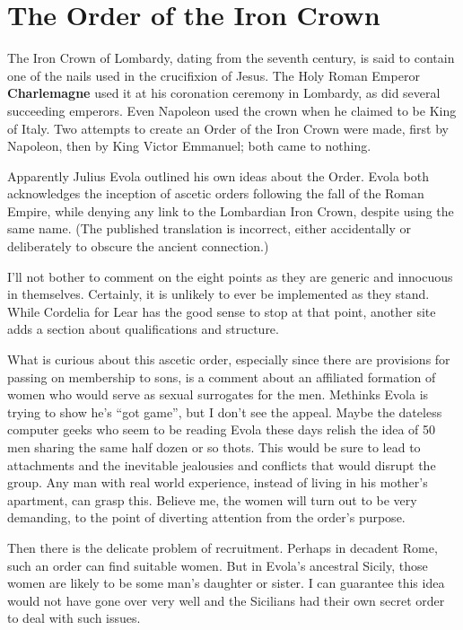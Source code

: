 \section{The Order of the Iron Crown}

The Iron Crown of Lombardy, dating from the seventh century, is said to contain one of the nails used in the crucifixion of Jesus. The Holy Roman Emperor \textbf{Charlemagne} used it at his coronation ceremony in Lombardy, as did several succeeding emperors. Even Napoleon used the crown when he claimed to be King of Italy. Two attempts to create an Order of the Iron Crown were made, first by Napoleon, then by King Victor Emmanuel; both came to nothing.

Apparently Julius Evola outlined his own ideas about the Order. Evola both acknowledges the inception of ascetic orders following the fall of the Roman Empire, while denying any link to the Lombardian Iron Crown, despite using the same name. (The published translation is incorrect, either accidentally or deliberately to obscure the ancient connection.)

I'll not bother to comment on the eight points as they are generic and innocuous in themselves. Certainly, it is unlikely to ever be implemented as they stand. While Cordelia for Lear has the good sense to stop at that point, another site adds a section about qualifications and structure.

What is curious about this ascetic order, especially since there are provisions for passing on membership to sons, is a comment about an affiliated formation of women who would serve as sexual surrogates for the men. Methinks Evola is trying to show he's ``got game'', but I don't see the appeal. Maybe the dateless computer geeks who seem to be reading Evola these days relish the idea of 50 men sharing the same half dozen or so thots. This would be sure to lead to attachments and the inevitable jealousies and conflicts that would disrupt the group. Any man with real world experience, instead of living in his mother's apartment, can grasp this. Believe me, the women will turn out to be very demanding, to the point of diverting attention from the order's purpose.

Then there is the delicate problem of recruitment. Perhaps in decadent Rome, such an order can find suitable women. But in Evola's ancestral Sicily, those women are likely to be some man's daughter or sister. I can guarantee this idea would not have gone over very well and the Sicilians had their own secret order to deal with such issues.

